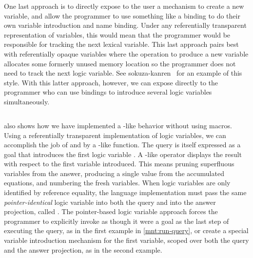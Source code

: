 \documentclass[runningheads,natbib=false]{llncs}
\begin{document}
One last approach is to directly expose to the user a mechanism to
create a new variable, and allow the programmer to use something like
a  binding to do their own variable introduction and
name binding. Under any referentially transparent representation of
variables, this would mean that the programmer would be responsible
for tracking the next lexical variable. This last approach pairs best
with referentially opaque variables where the operation to produce a
new variable allocates some formerly unused memory location so the
programmer does not need to track the next logic variable. See
sokuza-kanren~\cite{kiselyov2006taste} for an example of this style.
With this latter approach, however, we can expose 
directly to the programmer who can use  bindings to
introduce several logic variables simultaneously.

\subsection{}

 also shows how we have
implemented a -like behavior without using macros.
Using a referentially transparent implementation of logic variables,
we can accomplish the job of  and  by
a -like function. The query is itself
expressed as a goal that introduces the first logic variable
. A -like operator displays the result
with respect to the first variable introduced. This means pruning
superfluous variables from the answer, producing a single value from
the accumulated equations, and numbering the fresh variables. When
logic variables are only identified by reference equality, the
language implementation must pass the same \emph{pointer-identical}
logic variable into both the query and into the answer projection,
called . The pointer-based logic variable approach
forces the programmer to explicitly invoke  as
though it were a goal as the last step of executing the query, as in
the first example in \cref{mnt:run-query}, or create a special
variable introduction mechanism for the first variable, scoped over
both the query and the answer projection, as in the second example.

\end{document}
